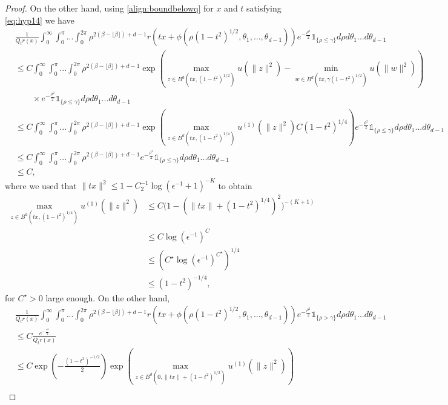 \documentclass[10pt,a4paper]{amsart}
\begin{document}
\begin{proof}
On the other hand, 
using \eqref{align:boundbelowq} for $x$ and $t$ satisfying \eqref{eq:hyp14} we have 
\begin{align*}
  &\frac{1}{Q_tr(x)} \int_0^{\infty}\int_0^\pi... \int_0^{2\pi} \rho^{2(\beta-\lfloor \beta \rfloor) +d-1 }r(tx +\phi(\rho(1-t^2)^{1/2},\theta_1,...,\theta_{d-1}))e^{-\frac{\rho^2}{2}}\mathds{1}_{\{\rho\leq \gamma\}}d\rho d\theta_1...d\theta_{d-1}  \\
  &\leq C\int_0^{\infty}\int_0^\pi... \int_0^{2\pi} \rho^{2(\beta-\lfloor \beta \rfloor) +d-1 }\exp\left(\max_{z\in B^d(tx,(1-t^2)^{1/2})}u(\|z\|^2)-\min_{w\in B^d(tx,\gamma(1-t^2)^{1/2})}u(\|w\|^2)\right)\\
  &\quad \quad \times e^{-\frac{\rho^2}{2}}\mathds{1}_{\{\rho\leq \gamma\}}d\rho d\theta_1...d\theta_{d-1}
  \\
  &\leq C\int_0^{\infty}\int_0^\pi... \int_0^{2\pi} \rho^{2(\beta-\lfloor \beta \rfloor) +d-1 }\exp\left(\max_{z\in B^d(tx,(1-t^2)^{1/4})}u^{(1)}(\|z\|^2)C(1-t^2)^{1/4}\right)e^{-\frac{\rho^2}{2}}\mathds{1}_{\{\rho\leq \gamma\}}d\rho d\theta_1...d\theta_{d-1}
  \\
  &\leq C\int_0^{\infty}\int_0^\pi... \int_0^{2\pi} \rho^{2(\beta-\lfloor \beta \rfloor) +d-1 }e^{-\frac{\rho^2}{2}}\mathds{1}_{\{\rho\leq \gamma\}}d\rho d\theta_1...d\theta_{d-1}\\
  &\leq C,
\end{align*}
where we used that $\|tx\|^2\leq 1-C_2^{-1}\log(\epsilon^{-1}+1)^{-K}$ to obtain
\begin{align*}
\max_{z\in B^d(tx,(1-t^2)^{1/4})}u^{(1)}(\|z\|^2)&\leq C\Big(1-(\|tx\|+(1-t^2)^{1/4})^2\Big)^{-(K+1)}\\
& \leq C\log(\epsilon^{-1})^C\\
& \leq \left(C^\star \log(\epsilon^{-1})^{C^\star}\right)^{1/4}\\
&\leq (1-t^2)^{-1/4},
\end{align*}
for $C^\star>0$ large enough.
On the other hand,
\begin{align*}
    &\frac{1}{Q_tr(x)} \int_0^{\infty}\int_0^\pi... \int_0^{2\pi} \rho^{2(\beta-\lfloor \beta \rfloor) +d-1 }r(tx +\phi(\rho(1-t^2)^{1/2},\theta_1,...,\theta_{d-1}))e^{-\frac{\rho^2}{2}}\mathds{1}_{\{\rho> \gamma\}}d\rho d\theta_1...d\theta_{d-1}\\
    &\leq C\frac{e^{-\frac{\gamma^2}{2}}}{Q_tr(x)}\\
    & \leq C\exp\left(-\frac{(1-t^2)^{-1/2}}{2}\right)\exp\left(\max_{z\in B^d(0,\|tx\|+(1-t^2)^{1/2})}u^{(1)}(\|z\|^2)\right)\\

\end{align*}
\end{proof}
\end{document}
